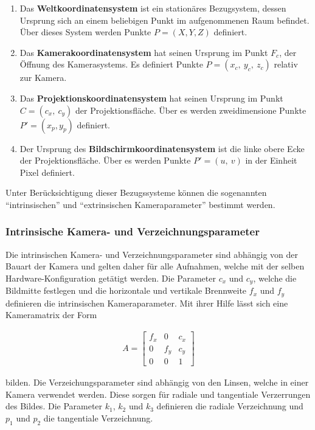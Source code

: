 \begin{enumerate}
    \item Das \textbf{Weltkoordinatensystem} ist ein stationäres Bezugsystem, dessen Ursprung sich an einem beliebigen Punkt
            im aufgenommenen Raum befindet. Über dieses System werden Punkte $P = (X, Y, Z)$ definiert.
    \item Das \textbf{Kamerakoordinatensystem} hat seinen Ursprung im Punkt $F_c$, der Öffnung des Kamerasystems.
            Es definiert Punkte $P = (x_c,\ y_c,\ z_c)$ relativ zur Kamera.
    \item Das \textbf{Projektionskoordinatensystem} hat seinen Ursprung im Punkt $C = (c_x,\ c_y)$ der Projektionsfläche.
            Über es werden zweidimensione Punkte $P' = (x_p, y_p)$ definiert.
    \item Der Ursprung des \textbf{Bildschirmkoordinatensystem} ist die linke obere Ecke der Projektionsfläche.
            Über es werden Punkte $P' = (u,\ v)$ in der Einheit Pixel definiert.
\end{enumerate}

Unter Berücksichtigung dieser Bezugssysteme können die sogenannten ``intrinsischen'' und ``extrinsischen Kameraparameter''
bestimmt werden.

\subsubsection{Intrinsische Kamera- und Verzeichnungsparameter}

Die intrinsischen Kamera- und Verzeichnungsparameter sind abhängig von der Bauart der Kamera und gelten
daher für alle Aufnahmen, welche mit der selben Hardware-Konfiguration getätigt werden.
Die Parameter $c_x$ und $c_y$, welche die Bildmitte festlegen und die
horizontale und vertikale Brennweite $f_x$ und $f_y$ definieren die intrinsischen Kameraparameter.
Mit ihrer Hilfe lässt sich eine Kameramatrix der Form

\begin{ceqn}
\begin{align}
A =
 \begin{bmatrix}
  f_x & 0 & c_x \\
  0 & f_y & c_y \\
  0 & 0 & 1
 \end{bmatrix}
\end{align}
\end{ceqn}

bilden.
Die Verzeichungsparameter sind abhängig von den Linsen, welche in einer Kamera verwendet werden. Diese sorgen
für radiale und tangentiale Verzerrungen des Bildes. Die Parameter $k_1$, $k_2$ und $k_3$ definieren die
radiale Verzeichnung und $p_1$ und $p_2$ die tangentiale Verzeichnung. \cite[]{Meissner2007}


